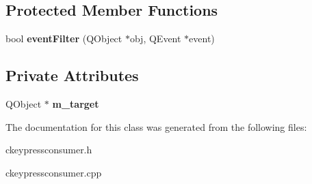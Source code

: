 \subsection*{Protected Member Functions}
\begin{DoxyCompactItemize}
\item 
\mbox{\label{class_c_key_press_consumer_a73981dd7e5107321304e438cab63c94b}} 
bool {\bfseries event\+Filter} (Q\+Object $\ast$obj, Q\+Event $\ast$event)
\end{DoxyCompactItemize}
\subsection*{Private Attributes}
\begin{DoxyCompactItemize}
\item 
\mbox{\label{class_c_key_press_consumer_a32bff013fbeac7d1c8e911b8fd4af1e1}} 
Q\+Object $\ast$ {\bfseries m\+\_\+target}
\end{DoxyCompactItemize}


The documentation for this class was generated from the following files\+:\begin{DoxyCompactItemize}
\item 
ckeypressconsumer.\+h\item 
ckeypressconsumer.\+cpp\end{DoxyCompactItemize}
